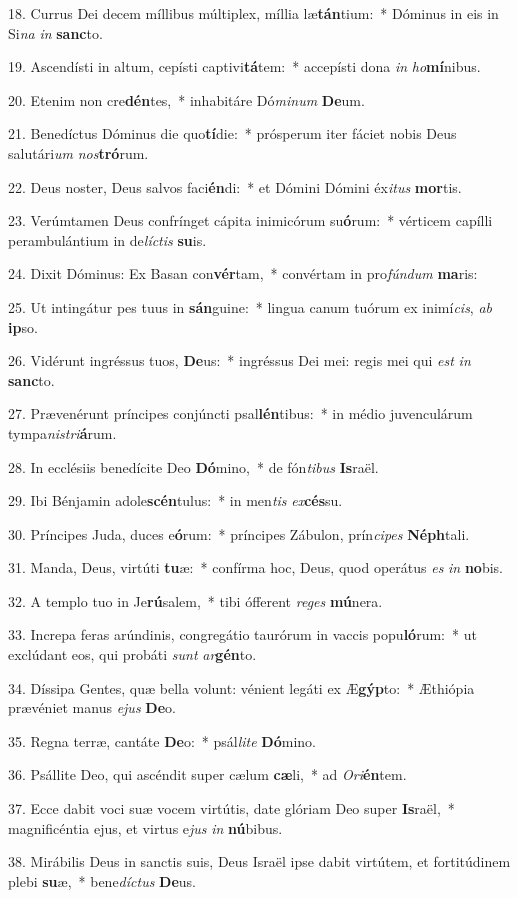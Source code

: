 18. Currus Dei decem míllibus múltiplex, míllia læ\textbf{tán}tium:~*  Dóminus in eis in Si\textit{na} \textit{in} \textbf{sanc}to.\

19. Ascendísti in altum, cepísti captivi\textbf{tá}tem:~*  accepísti dona \textit{in} \textit{ho}\textbf{mí}nibus.\

20. Etenim non cre\textbf{dén}tes,~*  inhabitáre Dó\textit{mi}\textit{num} \textbf{De}um.\

21. Benedíctus Dóminus die quo\textbf{tí}die:~*  prósperum iter fáciet nobis Deus salutári\textit{um} \textit{nos}\textbf{tró}rum.\

22. Deus noster, Deus salvos faci\textbf{én}di:~*  et Dómini Dómini éx\textit{i}\textit{tus} \textbf{mor}tis.\

23. Verúmtamen Deus confrínget cápita inimicórum su\textbf{ó}rum:~*  vérticem capílli perambulántium in de\textit{líc}\textit{tis} \textbf{su}is.\

24. Dixit Dóminus: Ex Basan con\textbf{vér}tam,~*  convértam in pro\textit{fún}\textit{dum} \textbf{ma}ris:\

25. Ut intingátur pes tuus in \textbf{sán}guine:~*  lingua canum tuórum ex inimí\textit{cis}, \textit{ab} \textbf{ip}so.\

26. Vidérunt ingréssus tuos, \textbf{De}us:~*  ingréssus Dei mei: regis mei qui \textit{est} \textit{in} \textbf{sanc}to.\

27. Prævenérunt príncipes conjúncti psal\textbf{lén}tibus:~*  in médio juvenculárum tympa\textit{nis}\textit{tri}\textbf{á}rum.\

28. In ecclésiis benedícite Deo \textbf{Dó}mino,~*  de fón\textit{ti}\textit{bus} \textbf{Is}raël.\

29. Ibi Bénjamin adole\textbf{scén}tulus:~*  in men\textit{tis} \textit{ex}\textbf{cés}su.\

30. Príncipes Juda, duces e\textbf{ó}rum:~*  príncipes Zábulon, prín\textit{ci}\textit{pes} \textbf{Néph}tali.\

31. Manda, Deus, virtúti \textbf{tu}æ:~*  confírma hoc, Deus, quod operátus \textit{es} \textit{in} \textbf{no}bis.\

32. A templo tuo in Je\textbf{rú}salem,~*  tibi ófferent \textit{re}\textit{ges} \textbf{mú}nera.\

33. Increpa feras arúndinis, congregátio taurórum in vaccis popu\textbf{ló}rum:~*  ut exclúdant eos, qui probáti \textit{sunt} \textit{ar}\textbf{gén}to.\

34. Díssipa Gentes, quæ bella volunt: vénient legáti ex Æ\textbf{gýp}to:~*  Æthiópia prævéniet manus \textit{e}\textit{jus} \textbf{De}o.\

35. Regna terræ, cantáte \textbf{De}o:~*  psál\textit{li}\textit{te} \textbf{Dó}mino.\

36. Psállite Deo, qui ascéndit super cælum \textbf{cæ}li,~*  ad \textit{O}\textit{ri}\textbf{én}tem.\

37. Ecce dabit voci suæ vocem virtútis, date glóriam Deo super \textbf{Is}raël,~*  magnificéntia ejus, et virtus e\textit{jus} \textit{in} \textbf{nú}bibus.\

38. Mirábilis Deus in sanctis suis, Deus Israël ipse dabit virtútem, et fortitúdinem plebi \textbf{su}æ,~*  bene\textit{díc}\textit{tus} \textbf{De}us.\

